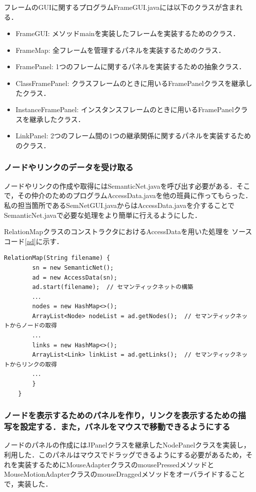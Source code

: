\documentclass[12pt]{jarticle}
\begin{document}
フレームのGUIに関するプログラムFrameGUI.javaには以下のクラスが含まれる．
\begin{itemize}
\item FrameGUI: メソッドmainを実装したフレームを実装するためのクラス．
\item FrameMap: 全フレームを管理するパネルを実装するためのクラス．
\item FramePanel: 1つのフレームに関するパネルを実装するための抽象クラス．
\item ClassFramePanel: クラスフレームのときに用いるFramePanelクラスを継承したクラス．
\item InstanceFramePanel: インスタンスフレームのときに用いるFramePanelクラスを継承したクラス．
\item LinkPanel: 2つのフレーム間の1つの継承関係に関するパネルを実装するためのクラス．
\end{itemize}

\subsubsection{ノードやリンクのデータを受け取る}
ノードやリンクの作成や取得にはSemanticNet.javaを呼び出す必要がある．そこで，その仲介のためのプログラムAccessData.javaを他の班員に作ってもらった．私の担当箇所であるSemNetGUI.javaからはAccessData.javaを介することでSemanticNet.javaで必要な処理をより簡単に行えるようにした．

RelationMapクラスのコンストラクタにおけるAccessDataを用いた処理を
ソースコード\ref{ad}に示す．

\begin{lstlisting}[caption=RelationMapクラスのコンストラクタ, label=ad]
    RelationMap(String filename) {
        sn = new SemanticNet();
        ad = new AccessData(sn);
        ad.start(filename);  // セマンティックネットの構築
        ．．．
        nodes = new HashMap<>();
        ArrayList<Node> nodeList = ad.getNodes();  // セマンティックネットからノードの取得
        ．．．
        links = new HashMap<>();
        ArrayList<Link> linkList = ad.getLinks();  // セマンティックネットからリンクの取得
        ．．．
        }
    }
\end{lstlisting}

\subsubsection{ノードを表示するためのパネルを作り，リンクを表示するための描写を設定する．また，パネルをマウスで移動できるようにする}
ノードのパネルの作成にはJPanelクラスを継承したNodePanelクラスを実装し，利用した．このパネルはマウスでドラッグできるようにする必要があるため，それを実装するためにMouseAdapterクラスのmousePressedメソッドとMouseMotionAdapterクラスのmouseDraggedメソッドをオーバライドすることで，実装した．
\end{document}
